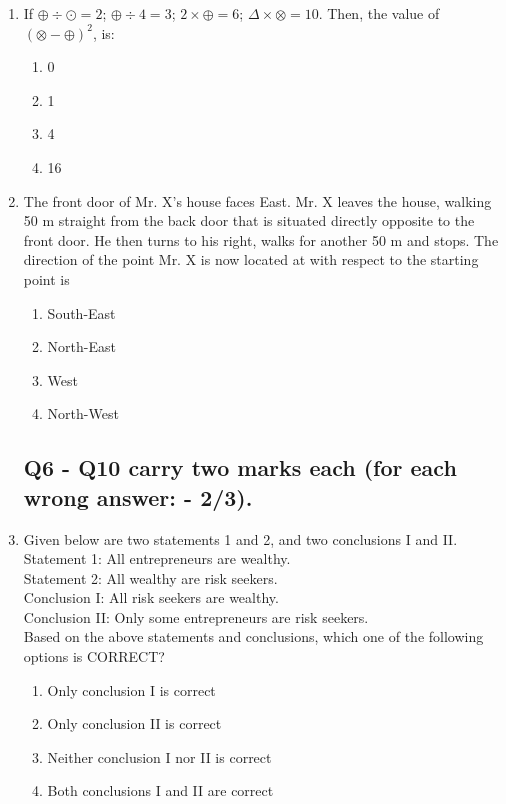 \documentclass[journal]{IEEEtran}
\theoremstyle{remark}
\begin{document}
\begin{enumerate}
\item If $\oplus\div\odot=2$; $\oplus\div4=3$; $2\times\oplus=6$; $\Delta\times\otimes=10$. Then, the value of $(\otimes-\oplus)^{2}$, is: \hfill{}
\begin{multicols}{4}
\begin{enumerate}
\item 0
\item 1
\item 4
\item 16
\end{enumerate}
\end{multicols}

\item The front door of Mr. X's house faces East. Mr. X leaves the house, walking 50 m straight from the back door that is situated directly opposite to the front door. He then turns to his right, walks for another 50 m and stops. The direction of the point Mr. X is now located at with respect to the starting point is \hfill{}
\begin{multicols}{4}
\begin{enumerate}
\item South-East
\item North-East
\item West
\item North-West
\end{enumerate}
\end{multicols}

\subsection*{Q6 - Q10 carry two marks each (for each wrong answer: - 2/3).}

\item Given below are two statements 1 and 2, and two conclusions I and II. \hfill{}\\
Statement 1: All entrepreneurs are wealthy. \\
Statement 2: All wealthy are risk seekers. \\
Conclusion I: All risk seekers are wealthy. \\
Conclusion II: Only some entrepreneurs are risk seekers. \\
Based on the above statements and conclusions, which one of the following options is CORRECT?
\begin{enumerate}
\item Only conclusion I is correct
\item Only conclusion II is correct
\item Neither conclusion I nor II is correct
\item Both conclusions I and II are correct
\end{enumerate}


\end{enumerate}
\end{document}
